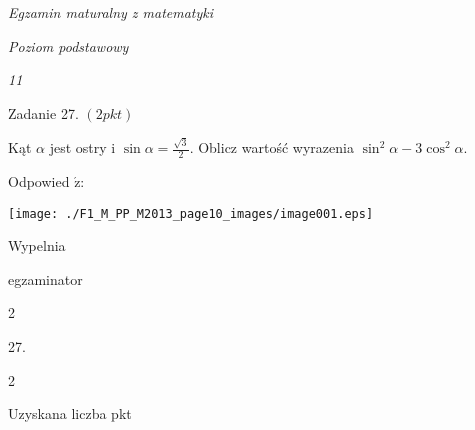 \documentclass[a4paper,12pt]{article}
\begin{document}
{\it Egzamin maturalny z matematyki}

{\it Poziom podstawowy}

{\it 11}

Zadanie 27. $(2pkt)$

Kąt $\alpha$ jest ostry i $\displaystyle \sin\alpha=\frac{\sqrt{3}}{2}$. Oblicz wartość wyrazenia $\sin^{2}\alpha-3\cos^{2}\alpha.$

Odpowied $\acute{\mathrm{z}}$:
\begin{center}
\texttt{[image: ./F1\_M\_PP\_M2013\_page10\_images/image001.eps]}
\end{center}
Wypelnia

egzaminator

2

27.

2

Uzyskana liczba pkt
\end{document}
